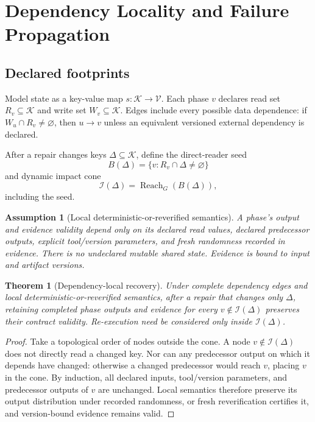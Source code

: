 \documentclass[11pt,a4paper]{article}
\newtheorem{assumption}[definition]{Assumption}
\newtheorem{theorem}[definition]{Theorem}
\newcommand{\Keys}{\mathcal K}
\newcommand{\Reach}{\operatorname{Reach}}
\begin{document}
\section{Dependency Locality and Failure Propagation}
\subsection{Declared footprints}
Model state as a key-value map $s:\Keys\to\mathcal V$. Each phase $v$ declares read set $R_v\subseteq\Keys$ and write set $W_v\subseteq\Keys$. Edges include every possible data dependence: if $W_u\cap R_v\neq\varnothing$, then $u\to v$ unless an equivalent versioned external dependency is declared.

After a repair changes keys $\Delta\subseteq\Keys$, define the direct-reader seed
\[
B(\Delta)=\{v:R_v\cap\Delta\neq\varnothing\}
\]
and dynamic impact cone
\[
\mathcal I(\Delta)=\Reach_G(B(\Delta)),
\]
including the seed.

\begin{assumption}[Local deterministic-or-reverified semantics]
A phase's output and evidence validity depend only on its declared read values, declared predecessor outputs, explicit tool/version parameters, and fresh randomness recorded in evidence. There is no undeclared mutable shared state. Evidence is bound to input and artifact versions.
\end{assumption}

\begin{theorem}[Dependency-local recovery]
\label{thm:local}
Under complete dependency edges and local deterministic-or-reverified semantics, after a repair that changes only $\Delta$, retaining completed phase outputs and evidence for every $v\notin\mathcal I(\Delta)$ preserves their contract validity. Re-execution need be considered only inside $\mathcal I(\Delta)$.
\end{theorem}
\begin{proof}
Take a topological order of nodes outside the cone. A node $v\notin\mathcal I(\Delta)$ does not directly read a changed key. Nor can any predecessor output on which it depends have changed: otherwise a changed predecessor would reach $v$, placing $v$ in the cone. By induction, all declared inputs, tool/version parameters, and predecessor outputs of $v$ are unchanged. Local semantics therefore preserve its output distribution under recorded randomness, or fresh reverification certifies it, and version-bound evidence remains valid.
\end{proof}
\end{document}
